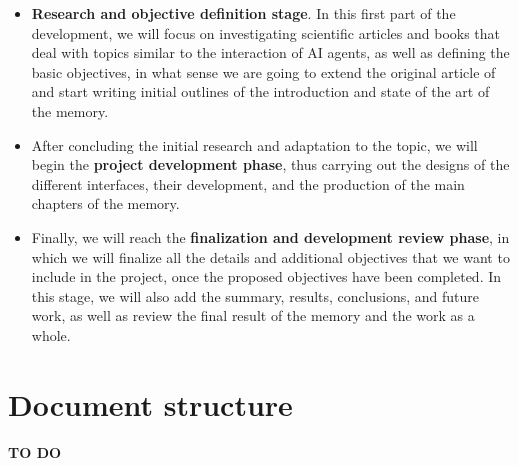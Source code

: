 \begin{itemize}
	
	\item \textbf{Research and objective definition stage}. In this first part of the development, we will focus on investigating scientific articles and books that deal with topics similar to the interaction of AI agents, as well as defining the basic objectives, in what sense we are going to extend the original article of \ga and start writing initial outlines of the introduction and state of the art of the memory.
	
	\item After concluding the initial research and adaptation to the topic, we will begin the \textbf{project development phase}, thus carrying out the designs of the different interfaces, their development, and the production of the main chapters of the memory.
	
	\item Finally, we will reach the \textbf{finalization and development review phase}, in which we will finalize all the details and additional objectives that we want to include in the project, once the proposed objectives have been completed. In this stage, we will also add the summary, results, conclusions, and future work, as well as review the final result of the memory and the work as a whole.

\end{itemize}

\section{Document structure}
\textbf{TO DO}



